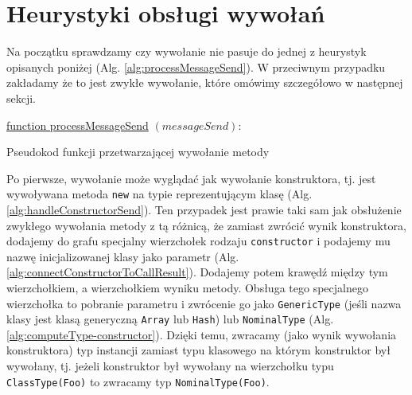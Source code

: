 \documentclass[declaration,shortabstract,mgr]{iithesis}
\newcommand{\algsize}{\small}
\begin{document}
\section{Heurystyki obsługi wywołań}

Na początku sprawdzamy czy wywołanie nie pasuje do jednej z heurystyk opisanych poniżej (Alg. \ref{alg:processMessageSend}). W przeciwnym przypadku zakładamy że to jest zwykłe wywołanie, które omówimy szczegółowo w następnej sekcji.

\begin{algorithm}
    \algsize
    \underline{function processMessageSend} $(\mathit{messageSend})$:\\
    \caption{Pseudokod funkcji przetwarzającej wywołanie metody}
    \label{alg:processMessageSend}
\end{algorithm}

Po pierwsze, wywołanie może wyglądać jak wywołanie konstruktora, tj. jest wywoływana metoda \texttt{new} na typie reprezentującym klasę (Alg. \ref{alg:handleConstructorSend}). Ten przypadek jest prawie taki sam jak obsłużenie zwykłego wywołania metody z tą różnicą, że zamiast zwrócić wynik konstruktora, dodajemy do grafu specjalny wierzchołek rodzaju \texttt{constructor} i podajemy mu nazwę inicjalizowanej klasy jako parametr (Alg. \ref{alg:connectConstructorToCallResult}). Dodajemy potem krawędź między tym wierzchołkiem, a wierzchołkiem wyniku metody. Obsługa tego specjalnego wierzchołka to pobranie parametru i zwrócenie go jako \texttt{GenericType} (jeśli nazwa klasy jest klasą generyczną \texttt{Array} lub \texttt{Hash}) lub \texttt{NominalType} (Alg. \ref{alg:computeType-constructor}). Dzięki temu, zwracamy (jako wynik wywołania konstruktora) typ instancji zamiast typu klasowego na którym konstruktor był wywołany, tj. jeżeli konstruktor był wywołany na wierzchołku typu \texttt{ClassType(Foo)} to zwracamy typ \texttt{NominalType(Foo)}.
\end{document}
